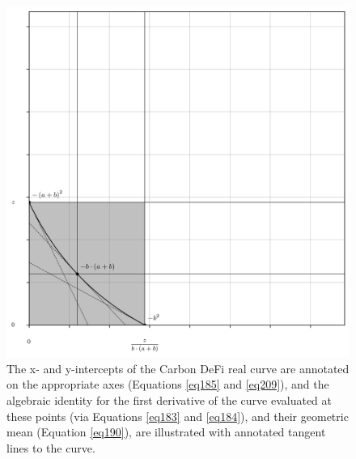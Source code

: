\documentclass{article}
\begin{document}
\begin{figure}[ht]
    \centering
    \includegraphics[width=\textwidth]{fig39.png}
    \captionsetup{
        justification=raggedright,
        singlelinecheck=false,
        font=small,
        labelfont=bf,
        labelsep=quad,
        format=plain
    }
    \caption{The x- and y-intercepts of the Carbon DeFi real curve are annotated on the appropriate axes (Equations \ref{eq185} and \ref{eq209}), and the algebraic identity for the first derivative of the curve evaluated at these points (via Equations \ref{eq183} and  \ref{eq184}), and their geometric mean (Equation \ref{eq190}), are illustrated with annotated tangent lines to the curve.}
    \label{fig39}
\end{figure}
\end{document}
